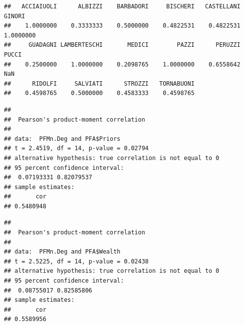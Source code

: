 \documentclass[
  notitlepage,
  onecolumn,
  openany]{book}
\newenvironment{Shaded}{\begin{snugshade}}{\end{snugshade}}
\newcommand{\AttributeTok}[1]{\textcolor[rgb]{0.77,0.63,0.00}{#1}}
\newcommand{\CommentTok}[1]{\textcolor[rgb]{0.56,0.35,0.01}{\textit{#1}}}
\newcommand{\FunctionTok}[1]{\textcolor[rgb]{0.00,0.00,0.00}{#1}}
\newcommand{\NormalTok}[1]{#1}
\newcommand{\OtherTok}[1]{\textcolor[rgb]{0.56,0.35,0.01}{#1}}
\newcommand{\SpecialCharTok}[1]{\textcolor[rgb]{0.00,0.00,0.00}{#1}}
\newcommand{\StringTok}[1]{\textcolor[rgb]{0.31,0.60,0.02}{#1}}
\begin{document}
\begin{verbatim}
##   ACCIAIUOLI      ALBIZZI    BARBADORI     BISCHERI   CASTELLANI       GINORI 
##    1.0000000    0.3333333    0.5000000    0.4822531    0.4822531    1.0000000 
##     GUADAGNI LAMBERTESCHI       MEDICI        PAZZI      PERUZZI        PUCCI 
##    0.2500000    1.0000000    0.2098765    1.0000000    0.6558642          NaN 
##      RIDOLFI     SALVIATI      STROZZI   TORNABUONI 
##    0.4598765    0.5000000    0.4583333    0.4598765
\end{verbatim}

\begin{Shaded}
\end{Shaded}

\begin{verbatim}
## 
##  Pearson's product-moment correlation
## 
## data:  PFMn.Deg and PFA$Priors
## t = 2.4519, df = 14, p-value = 0.02794
## alternative hypothesis: true correlation is not equal to 0
## 95 percent confidence interval:
##  0.07193331 0.82079537
## sample estimates:
##       cor 
## 0.5480948
\end{verbatim}

\begin{Shaded}
\end{Shaded}

\begin{verbatim}
## 
##  Pearson's product-moment correlation
## 
## data:  PFMn.Deg and PFA$Wealth
## t = 2.5225, df = 14, p-value = 0.02438
## alternative hypothesis: true correlation is not equal to 0
## 95 percent confidence interval:
##  0.08755017 0.82585806
## sample estimates:
##       cor 
## 0.5589956
\end{verbatim}

\begin{Shaded}
\end{Shaded}
\end{document}
